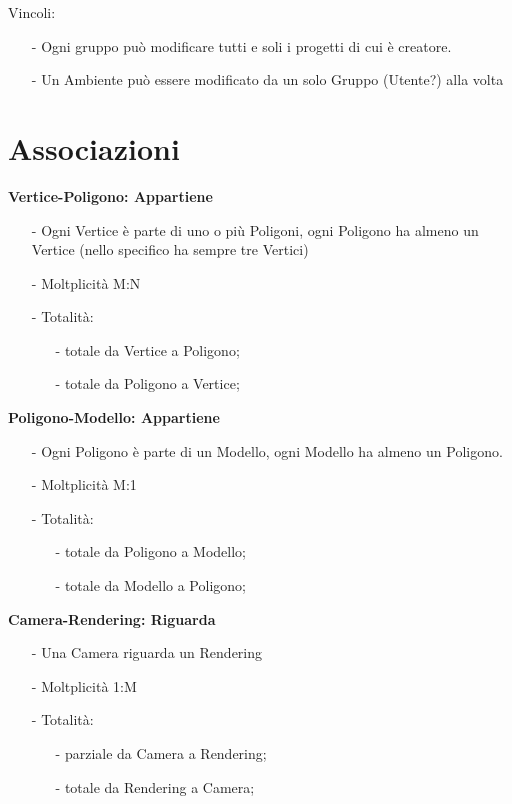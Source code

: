 \documentclass[a4paper,12pt]{report}
\begin{document}
Vincoli: 
\begin{itemize}
	\item[-] Ogni gruppo può modificare tutti e soli i progetti di cui è creatore.
	\item[-] Un Ambiente può essere modificato da un solo Gruppo (Utente?) alla volta
\end{itemize}
\section{Associazioni}
{\bf Vertice-Poligono: Appartiene}
\begin{itemize}
	\item[-] Ogni Vertice è parte di uno o più Poligoni, ogni Poligono ha almeno un Vertice (nello specifico ha sempre tre Vertici)
	\item[-] Moltplicità M:N
	\item[-] Totalità:
	\begin{small}\begin{itemize}
			\item[-] totale da Vertice a Poligono;
			\item[-] totale da Poligono a Vertice;
		\end{itemize}\end{small}
\end{itemize}
{\bf Poligono-Modello: Appartiene}
\begin{itemize}
	\item[-] Ogni Poligono è parte di un Modello, ogni Modello ha almeno un Poligono.
	\item[-] Moltplicità M:1
	\item[-] Totalità:
	\begin{small}\begin{itemize}
		\item[-] totale da Poligono a Modello;
		\item[-] totale da Modello a Poligono;
	\end{itemize}\end{small}
\end{itemize}
{\bf Camera-Rendering: Riguarda}
\begin{itemize}
	\item[-] Una Camera riguarda un Rendering
	\item[-] Moltplicità 1:M
	\item[-] Totalità:
	\begin{small}\begin{itemize}
		\item[-] parziale da Camera a Rendering;
		\item[-] totale da Rendering a Camera;
	\end{itemize}\end{small}
\end{itemize}
\end{document}
